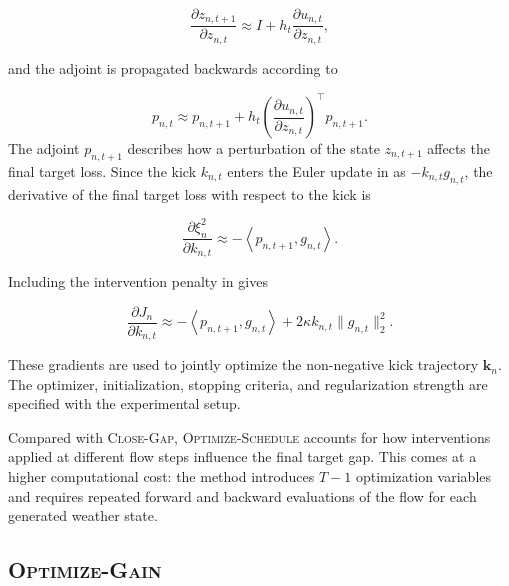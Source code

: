 \begin{equation}
    \frac{\partial z_{n,t+1}}
         {\partial z_{n,t}}
    \approx
    I
    +
    h_t
    \frac{\partial u_{n,t}}
         {\partial z_{n,t}},
\end{equation}

and the adjoint is propagated backwards according to

\begin{equation}
    p_{n,t}
    \approx
    p_{n,t+1}
    +
    h_t
    \left(
        \frac{\partial u_{n,t}}
             {\partial z_{n,t}}
    \right)^{\!\top}
    p_{n,t+1}.
    \label{eq:frozen-gradient-adjoint}
\end{equation}
The adjoint $p_{n,t+1}$ describes how a perturbation of the state
$z_{n,t+1}$ affects the final target loss. Since the kick $k_{n,t}$
enters the Euler update in  as
$-k_{n,t}g_{n,t}$, the derivative of the final target loss with respect
to the kick is

\begin{equation}
    \frac{\partial \xi_n^2}
         {\partial k_{n,t}}
    \approx
    -
    \left\langle
        p_{n,t+1},
        g_{n,t}
    \right\rangle.
    \label{eq:kick-target-gradient}
\end{equation}

Including the intervention penalty in
 gives

\begin{equation}
    \frac{\partial J_n}
         {\partial k_{n,t}}
    \approx
    -
    \left\langle
        p_{n,t+1},
        g_{n,t}
    \right\rangle
    +
    2\kappa
    k_{n,t}
    \lVert g_{n,t}\rVert_2^2.
    \label{eq:kick-objective-gradient}
\end{equation}

These gradients are used to jointly optimize the non-negative kick trajectory
$\mathbf{k}_n$. The optimizer, initialization, stopping criteria, and
regularization strength are specified with the experimental setup.

Compared with \textsc{Close-Gap}, \textsc{Optimize-Schedule} accounts for how
interventions applied at different flow steps influence the final target gap.
This comes at a higher computational cost: the method introduces $T-1$
optimization variables and requires repeated forward and backward evaluations
of the flow for each generated weather state.

\subsection{\textsc{Optimize-Gain}}
\label{sec:optimize-gain}

